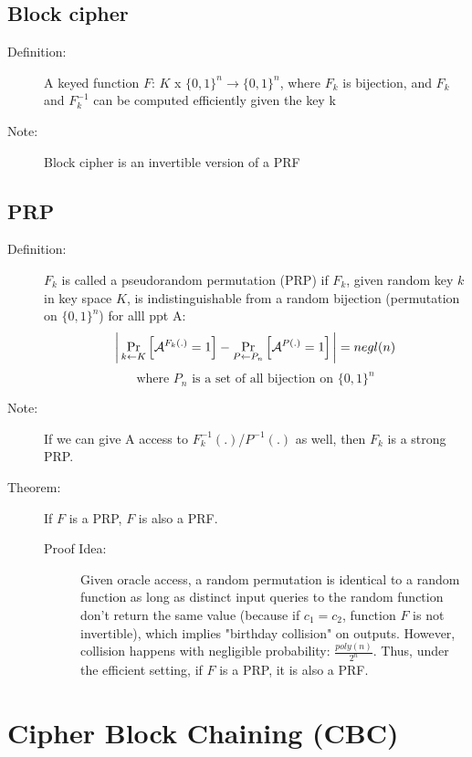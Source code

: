 \documentclass{scribe}
\begin{document}
\subsection{Block cipher}
\begin{description}
    \item[Definition:] A keyed function $F$: $K$ x $\{0,1\}^{n} \rightarrow \{0,1\}^{n}$, where $F_{k}$ is bijection, and $F_{k}$ and $F_{k}^{-1}$ can be computed efficiently given the key k 
     \item[Note:] Block cipher is an invertible version of a PRF
\end{description}

\subsection{PRP}
\begin{description}
    \item[Definition:] $F_k$ is called a pseudorandom permutation (PRP) if $F_k$, given random key $k$ in key space $K$, is indistinguishable from a random bijection (permutation on $\{0,1\}^{n}$) for alll ppt A:
    \[
   \bigg| \Pr_{k \leftarrow{K}}\left[\cal A^{\text{$F_k(.)$}} = \text{1} \right] - \Pr_{P \leftarrow{P_n}}\left[\cal A^{\text{$P(.)$}} = \text{1}\right]\bigg| = negl(n)\]
  \[ \text{where $P_n$ is a set of all bijection on $\{0,1\}^{n}$}
  \]
  \item[Note:] If we can give A access to $F_k^{-1}(.)$/$P^{-1}(.)$ as well, then $F_k$ is a strong PRP.
  \item[Theorem:] If $F$ is a PRP, $F$ is also a PRF.
  \begin{description}
      \item[Proof Idea:] Given oracle access, a random permutation is identical to a random function as long as distinct input queries to the random function don't return the same value (because if $c_1=c_2$, function $F$ is not invertible), which implies "birthday collision" on outputs. However, collision happens with negligible probability: $\frac{poly(n)}{2^{n}}$. Thus, under the efficient setting, if $F$ is a PRP, it is also a PRF.
  \end{description}
\end{description}

\section{Cipher Block Chaining (CBC)}
\end{document}

